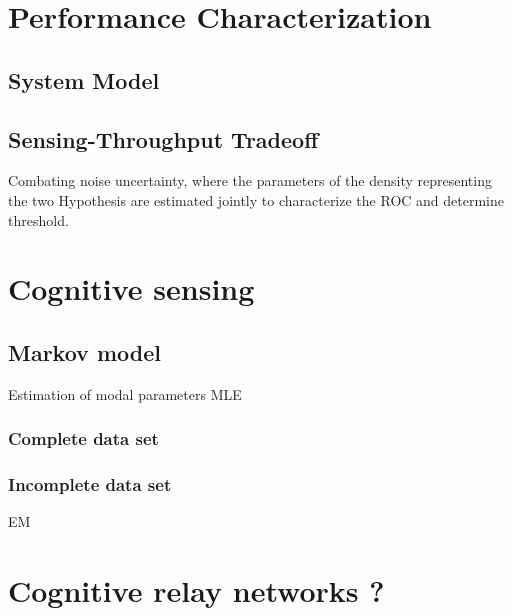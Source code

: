 \section{Performance Characterization}
\subsection{System Model}
\subsection{Sensing-Throughput Tradeoff}
Combating noise uncertainty, where the parameters of the density representing the two Hypothesis are estimated jointly to characterize the \ac{ROC} and determine threshold. 

\section{Cognitive sensing}
\subsection{Markov model}
Estimation of modal parameters
\ac{MLE}
\subsubsection{Complete data set}
\subsubsection{Incomplete data set}
\ac{EM}\cite{Kaushik_WCNC} 

\section{Cognitive relay networks ?}
